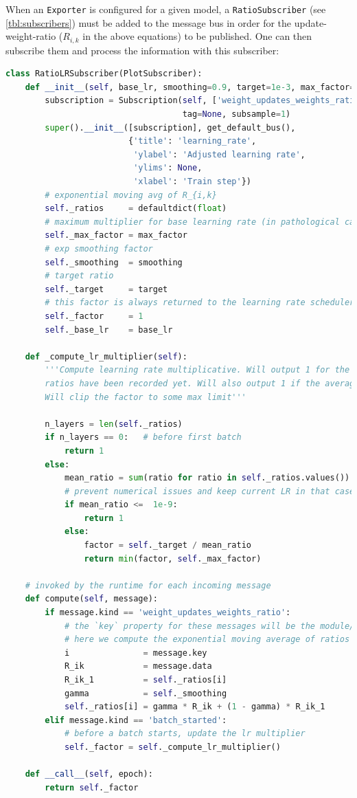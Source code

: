 When an \verb+Exporter+ is configured for a given model, a
\verb+RatioSubscriber+ (see \cref{tbl:subscribers}) must be added to the message
bus in order for the update-weight-ratio ($R_{i,k}$ in the above equations) to be
published. One can then subscribe them and process the information with this
subscriber:
\begin{lstlisting}[language=Python]
class RatioLRSubscriber(PlotSubscriber):
    def __init__(self, base_lr, smoothing=0.9, target=1e-3, max_factor=500):
        subscription = Subscription(self, ['weight_updates_weights_ratio', 'batch_started'],
                                    tag=None, subsample=1)
        super().__init__([subscription], get_default_bus(),
                         {'title': 'learning_rate',
                          'ylabel': 'Adjusted learning rate',
                          'ylims': None,
                          'xlabel': 'Train step'})
        # exponential moving avg of R_{i,k}
        self._ratios     = defaultdict(float)
        # maximum multiplier for base learning rate (in pathological cases)
        self._max_factor = max_factor
        # exp smoothing factor
        self._smoothing  = smoothing
        # target ratio
        self._target     = target
        # this factor is always returned to the learning rate scheduler
        self._factor     = 1
        self._base_lr    = base_lr

    def _compute_lr_multiplier(self):
        '''Compute learning rate multiplicative. Will output 1 for the first batch since no layer
        ratios have been recorded yet. Will also output 1 if the average ratio is close to 0.
        Will clip the factor to some max limit'''

        n_layers = len(self._ratios)
        if n_layers == 0:   # before first batch
            return 1
        else:
            mean_ratio = sum(ratio for ratio in self._ratios.values()) / n_layers
            # prevent numerical issues and keep current LR in that case
            if mean_ratio <=  1e-9:
                return 1
            else:
                factor = self._target / mean_ratio
                return min(factor, self._max_factor)

    # invoked by the runtime for each incoming message
    def compute(self, message):
        if message.kind == 'weight_updates_weights_ratio':
            # the `key` property for these messages will be the module/layer
            # here we compute the exponential moving average of ratios
            i               = message.key
            R_ik            = message.data
            R_ik_1          = self._ratios[i]
            gamma           = self._smoothing
            self._ratios[i] = gamma * R_ik + (1 - gamma) * R_ik_1
        elif message.kind == 'batch_started':
            # before a batch starts, update the lr multiplier
            self._factor = self._compute_lr_multiplier()

    def __call__(self, epoch):
        return self._factor
\end{lstlisting}

